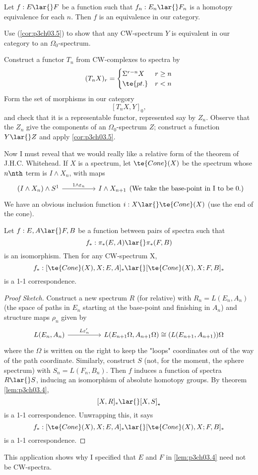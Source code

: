 \documentclass[../main]{subfiles}
\begin{document}
\begin{examples}
Let $f: E\lar{} F$ be a function such that $f_n: E_n\lar{} F_n$ is a
homotopy equivalence for each $n$. Then $f$ is an equivalence in our
category. 
\end{examples}
\begin{exercise}
Use (\ref{cor:p3ch03.5}) to show that any CW-spectrum $Y$ is equivalent in our category to an $\Omega_0$-spectrum.
\end{exercise}
\begin{hint}
Construct a functor $T_n$ from CW-complexes to spectra by \[(T_nX)_r =\begin{cases}\Sigma^{r-n}X & r\geq n\\ \te{pt.} & r<n\end{cases}\]
Form the set of morphisms in our category \[[T_nX,Y]_0,\] and check that it is a representable functor, represented say by $Z_n$. Observe that the $Z_n$ give the components of an $\Omega_0$-spectrum $Z$; construct a function $Y\lar{}Z$ and apply \ref{cor:p3ch03.5}.
\end{hint}

Now I must reveal that we would really like a relative form of the
theorem of J.H.C. Whitehead. If $X$ is a spectrum, let $\te{Cone}(X)$ be
the spectrum whose $n\nth$ term is $I\wedge X_n$, with maps
\[\begin{tikzcd}
(I\wedge X_n)\wedge S^1 \arrow[rr, "1\wedge \varepsilon_n"] &  & I\wedge X_{n+1} 
\end{tikzcd} \text{(We take the base-point in I to be 0.)}\] 
We have an obvious inclusion function $i:X\lar{} \te{Cone}(X)$ (use the end of the cone).
\begin{customthm}{3.6}\label{thm:p3ch03.6}
Let $f:E,A\lar{} F,B$ be a function between pairs of spectra such that \[f_\ast:\pi_\ast(E,A)\lar{} \pi_\ast (F,B)\] is an isomorphism. Then for any CW-spectrum X, \[f_\ast:[\te{Cone}(X),X; E,A]_\ast \lar{}[\te{Cone}(X),X; F,B]_\ast\]
is a 1-1 correspondence.
\end{customthm}
\begin{proof}[Proof Sketch]
Construct a new spectrum $R$ (for relative) with $R_n=L(E_n,A_n)$ (the space of paths in $E_n$ starting at the base-point and finishing in $A_n$) and structure maps $\rho_n$ given by 
\[\begin{tikzcd}
{L(E_n,A_n)} \arrow[rr, "L\varepsilon'_n"] &  & {L(E_{n+1} \Omega, A_{n+1} \Omega)\cong (L(E_{n+1},A_{n+1}))\Omega}
\end{tikzcd}  \]
where the $\Omega$ is written on the right to keep the "loops" coordinates out of the way of the path coordinate. Similarly, construct $S$ (not, for the moment, the sphere spectrum) with $S_n=L(F_n,B_n)$. Then $f$ induces a function of spectra $R\lar{} S$, inducing an isomorphism of absolute homotopy groups. By theorem \ref{lem:p3ch03.4}, 
\[[X,R]_\ast \lar{} [X,S]_\star \]
is a 1-1 correspondence. Unwrapping this, it says \[f_\ast:[\te{Cone}(X),X; E,A]_\ast \lar{}[\te{Cone}(X),X; F,B]_\ast\]
is a 1-1 correspondence.
\end{proof}
This application shows why I specified that $E$ and $F$ in \ref{lem:p3ch03.4} need
not be CW-spectra. 
\end{document}
